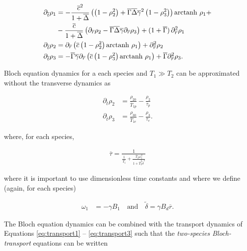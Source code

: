 \documentclass[%
oneside,                 %
final,                   %
10pt]{article}
\begin{document}
\begin{align} 
	\partial_{\overline{t}} \rho_1 
	&=
	-\frac{\overline{c}^2}{1+\overline{\Delta}}
	\left(
		\left(
			1 - \rho_2^2
		\right)
		+
		\overline{\Gamma}\overline{\Delta}\overline{\gamma}^2
		\left(
			1 - \rho_3^2
		\right)
	\right)
	\text{arctanh }\rho_1 + 
	\nonumber\\
	&-\frac{\overline{c}}{1+\overline{\Delta}}
	\left(
		\partial_{\overline{r}} \rho_2 - \overline{\Gamma}\overline{\Delta}\overline{\gamma} \partial_{\overline{r}} \rho_3
	\right)
	+ ( 1 + \overline{\Gamma} )\, \partial_{\overline{r}}^2 \rho_1
	\label{eq:transport1} \\
	\partial_{\overline{t}} \rho_2 
	&=
	\partial_{\overline{r}}
	\left(
		\overline{c}
		\left( 1 - \rho_2^2 \right)
		\text{arctanh }\rho_1
	\right)
	+ \partial_{\overline{r}}^2 \rho_2
	\label{eq:transport2} \\
	\partial_{\overline{t}} \rho_3
	&=
	- 
	\overline{\Gamma}\overline{\gamma}
	\partial_{\overline{r}}
	\left(
		\overline{c}
		\left( 1 - \rho_3^2 \right)
		\text{arctanh }\rho_1
	\right)
	+ \overline{\Gamma} \partial_{\overline{r}}^2 \rho_3 .
	\label{eq:transport3}
\end{align}

Bloch equation dynamics for a each species and $T_1 \gg T_2$ can be approximated without the transverse dynamics as \cite{Picone2010,Grivet1993}

\begin{align}
	\partial_{\overline{t}} \rho_2 &= \frac{\rho_{20}}{\overline{T}_{1p}} - \frac{\rho_2}{\overline{\tau}_p} \\
	\partial_{\overline{t}} \rho_3 &= \frac{\rho_{30}}{\overline{T}_{1e}} - \frac{\rho_3}{\overline{\tau}_e}.
\end{align}

where, for each species,

\begin{align}
	\overline{\tau} = \frac{1}{\frac{1}{\overline{T}_1} + \frac{\overline{T}_2 \omega_1^2}{1+\overline{T}_2^2 \tilde{\delta}^2}}
\end{align}

where it is important to use dimensionless time constants and where we define (again, for each species)

\begin{align}
	\omega_1 &= -\gamma B_1 \quad \text{and} \quad
	\tilde{\delta} = \gamma B_d \overline{r}.
\end{align}

The Bloch equation dynamics can be combined with the transport dynamics of Equations \ref{eq:transport1} -- \ref{eq:transport3} such that the \emph{two-species Bloch-transport} equations can be written
\end{document}
